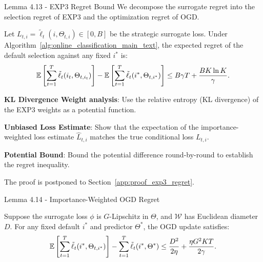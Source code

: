 \begin{sourceblock}{Lemma 4.13 - EXP3 Regret Bound}
We decompose the surrogate regret into the selection regret of EXP3 and the optimization regret of OGD.
\begin{lemma}
\label{lem:exp3_regret}
Let $L_{t, i} = \tilde{\ell}_t(i, \Theta_{t,i}) \in [0, B]$ be the strategic surrogate loss. Under Algorithm~\ref{alg:online_classification_main_text}, the expected regret of the default selection against any fixed $i^*$ is:
\begin{equation}
    \label{eq:exp3_regret}
    \mathbb{E}\left[ \sum_{t=1}^T \tilde{\ell}_t(i_t, \Theta_{t, i_t}) \right] - \mathbb{E}\left[ \sum_{t=1}^T \tilde{\ell}_t(i^*, \Theta_{t, i^*}) \right] \le B \gamma T + \frac{B K \ln K}{\gamma}.
\end{equation}
\end{lemma}
\end{sourceblock}

\begin{guideblock}
\item \textbf{KL Divergence Weight analysis}: Use the relative entropy (KL divergence) of the EXP3 weights as a potential function.
\item \textbf{Unbiased Loss Estimate}: Show that the expectation of the importance-weighted loss estimate $\hat{L}_{t, i}$ matches the true conditional loss $L_{t,i}$.
\item \textbf{Potential Bound}: Bound the potential difference round-by-round to establish the regret inequality.
\end{guideblock}
The proof is postponed to Section~\ref{app:proof_exp3_regret}.

\begin{sourceblock}{Lemma 4.14 - Importance-Weighted OGD Regret}
\begin{lemma}
\label{lem:ogd_regret}
Suppose the surrogate loss $\phi$ is $G$-Lipschitz in $\Theta$, and $\mathcal{W}$ has Euclidean diameter $D$. For any fixed default $i^*$ and predictor $\Theta^*$, the OGD update satisfies:
\begin{equation}
    \label{eq:ogd_regret}
    \mathbb{E}\left[ \sum_{t=1}^T \tilde{\ell}_t(i^*, \Theta_{t, i^*}) \right] - \sum_{t=1}^T \tilde{\ell}_t(i^*, \Theta^*) \le \frac{D^2}{2\eta} + \frac{\eta G^2 K T}{2 \gamma}.
\end{equation}
\end{lemma}
\end{sourceblock}

